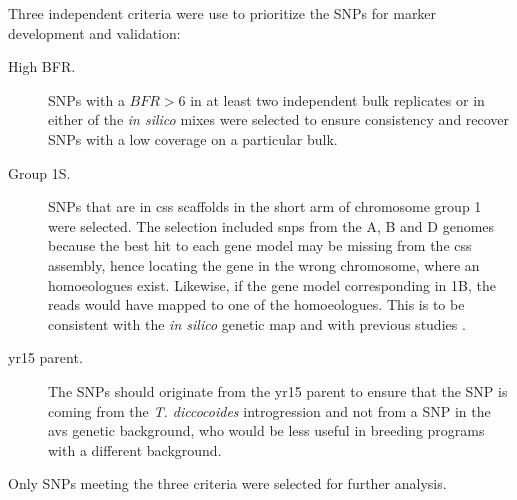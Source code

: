 Three independent criteria were use to prioritize the SNPs for marker development and validation: 

\begin{description}
\item[High BFR.] SNPs with a $BFR>6$ in at least two independent bulk replicates or in either of the \textit{in silico} mixes were selected to ensure consistency and recover SNPs with a low coverage on a particular bulk. 
\item[Group 1S.] SNPs that are in \acrshort{css} scaffolds in the short arm of chromosome group 1 were selected.
The selection included \glspl{snp} from the A, B and D genomes because the best hit to each gene model may be missing from the \gls{css} assembly, hence locating the gene in the wrong chromosome, where an homoeologues exist. 
Likewise, if the gene model corresponding in 1B, the reads would have mapped to one of the homoeologues.
This is to be consistent with the \textit{in silico} genetic map and with previous studies \citep{Murphy2009,Peng2000,Grama1997}.
\item[\acrshort{yr15} parent.] The SNPs should originate from the \acrshort{yr15} parent to ensure that the SNP is coming from the \textit{T. diccocoides} introgression and not from a SNP in the \acrshort{avs} genetic background, who would be less useful in breeding programs with a different background.
\end{description}

Only SNPs meeting the three criteria were selected for further analysis. 

